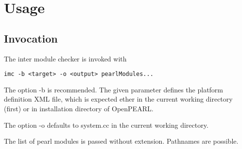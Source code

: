 \chapter{Usage}

\section{Invocation}
The inter module checker is invoked with
\begin{verbatim}
imc -b <target> -o <output> pearlModules...
\end{verbatim}

The option -b is  recommended. The given parameter defines the
platform definition XML file, which is expected ether in the current 
working directory (first)
or in installation directory of OpenPEARL.

The option -o defaults to system.cc in the current working directory.

The list of pearl modules is passed without extension. Pathnames are 
possible.




